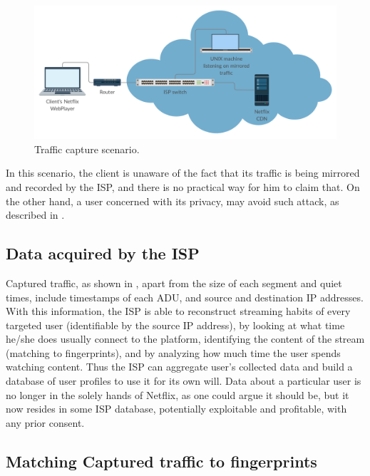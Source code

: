 
\begin{figure}[!htb]
  \centering
  \includegraphics[width=\columnwidth]{img/schema.png}
  \caption{Traffic capture scenario.}
  \label{fig:schema}
\end{figure}

In this scenario, the client is unaware of the fact that its traffic is being
mirrored and recorded by the ISP, and there is no practical way for him to
claim that. On the other hand, a user concerned with its privacy, may avoid
such attack, as described in .

\subsection{Data acquired by the ISP}

Captured traffic, as shown in , apart from the size of each
segment and quiet times, include timestamps of each ADU, and source and
destination IP addresses. With this information, the ISP is able to reconstruct
streaming habits of every targeted user (identifiable by the source IP
address),  by looking at what time he/she does usually connect to the platform,
identifying the content of the stream (matching to fingerprints), and by
analyzing how much time the user spends watching content. Thus the ISP can
aggregate user's collected data and build a database of user profiles to use it
for its own will. Data about a particular user is no longer in the solely hands
of Netflix, as one could argue it should be, but it now resides in some ISP
database, potentially exploitable and profitable, with any prior consent.

\subsection{Matching Captured traffic to fingerprints}

